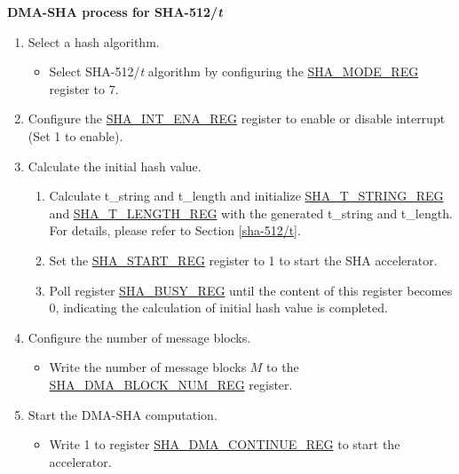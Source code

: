 \documentclass[main\_\_EN.tex]{subfiles}
\begin{document}

\textbf{DMA-SHA process for SHA-512/{\it{t}}}

\begin{enumerate}
    \item Select a hash algorithm.
    \begin{itemize}
        \item Select SHA-512/{\it{t}} algorithm by configuring the \hyperref[regdesc:SHAMODEREG]{SHA\_MODE\_REG} register to 7.
    \end{itemize}

    \item Configure the \hyperref[regdesc:SHAINTENAREG]{SHA\_INT\_ENA\_REG} register to enable or disable interrupt (Set 1 to enable).

    \item Calculate the initial hash value.
        \begin{enumerate}
            \item Calculate t\_string and t\_length and initialize \hyperref[regdesc:SHATSTRINGREG]{SHA\_T\_STRING\_REG} and  \hyperref[regdesc:SHATLENGTHREG]{SHA\_T\_LENGTH\_REG} with the generated t\_string and t\_length. For details, please refer to Section \ref{sha-512/t}.
            \item Set the \hyperref[regdesc:SHASTARTREG]{SHA\_START\_REG} register to 1 to start the SHA accelerator.
            \item Poll register \hyperref[regdesc:SHABUSYREG]{SHA\_BUSY\_REG} until the content of this register becomes 0, indicating the calculation of initial hash value is completed.
        \end{enumerate}

    \item Configure the number of message blocks.
    \begin{itemize}
        \item  Write the number of message blocks \begin{math}M\end{math} to the  \hyperref[regdesc:SHADMABLOCKNUMREG]{SHA\_DMA\_BLOCK\_NUM\_REG} register.
    \end{itemize}

    \item Start the DMA-SHA computation.
        \begin{itemize}
            \item Write 1 to register \hyperref[regdesc:SHADMACONTINUEREG]{SHA\_DMA\_CONTINUE\_REG} to start the accelerator.
        \end{itemize}


\end{enumerate}
\end{document}

